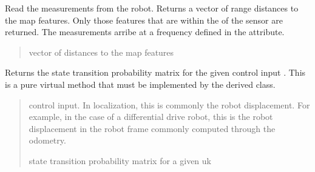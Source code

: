 \documentclass[letterpaper,10pt,english]{sphinxmanual}
\begin{document}
\begin{fulllineitems}
\begin{fulllineitems}
\label{\detokenize{GridLocalization:GL_3DOFDifferentialDrive.GL_3DOFDifferentialDrive.GetMeasurements}}
\pysigstartsignatures
{}
\pysigstopsignatures
\sphinxAtStartPar
Read the measurements from the robot. Returns a vector of range distances to the map features.
Only those features that are within the  of the sensor are returned.
The measurements arribe at a frequency defined in the  attribute.
\begin{quote}\begin{description}
\sphinxAtStartPar
vector of distances to the map features

\end{description}\end{quote}

\end{fulllineitems}


\begin{fulllineitems}
\label{\detokenize{GridLocalization:GL_3DOFDifferentialDrive.GL_3DOFDifferentialDrive.StateTransitionProbability_4_uk}}
\pysigstartsignatures
{}
\pysigstopsignatures
\sphinxAtStartPar
Returns the state transition probability matrix for the given control input .
This is a pure virtual method that must be implemented by the derived class.
\begin{quote}\begin{description}
\sphinxAtStartPar
{} \textendash{} control input. In localization, this is commonly the robot displacement. For example, in the case of a differential drive robot, this is the robot displacement in the robot frame commonly computed through the odometry.

\sphinxAtStartPar
{} state transition probability matrix for a given uk


\end{description}
\end{quote}
\end{fulllineitems}
\end{fulllineitems}
\end{document}

